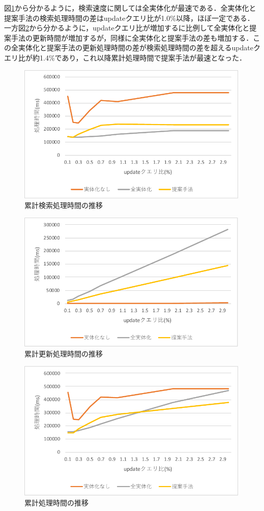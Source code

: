\documentclass[a4paper,11pt]{ujreport}
\begin{document}
図\ref{figure:Experiment-find}から分かるように，検索速度に関しては全実体化が最速である．全実体化と提案手法の検索処理時間の差はupdateクエリ比が1.0\%以降，ほぼ一定である．一方図\ref{figure:Experiment-update}から分かるように，updateクエリ比が増加するに比例して全実体化と提案手法の更新時間が増加するが，同様に全実体化と提案手法の差も増加する．この全実体化と提案手法の更新処理時間の差が検索処理時間の差を超えるupdateクエリ比が約1.4\%であり，これ以降累計処理時間で提案手法が最速となった．

\begin{figure}[htbp]
	\begin{center}
		\includegraphics[width=30em]{src/Experiment-find.pdf} %
	\end{center}
	\caption{累計検索処理時間の推移}
	\label{figure:Experiment-find}
\end{figure}
\begin{figure}[htbp]
	\begin{center}
		\includegraphics[width=30em]{src/Experiment-update.pdf} %
	\end{center}
	\caption{累計更新処理時間の推移}
	\label{figure:Experiment-update}
\end{figure}
\begin{figure}[htbp]
	\begin{center}
		\includegraphics[width=30em]{src/Experiment-total.pdf} %
	\end{center}
	\caption{累計処理時間の推移}
	\label{figure:Experiment-total}
\end{figure}
\end{document}
